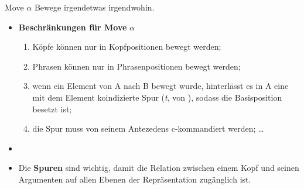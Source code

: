 \begin{frame}

\begin{block}{Move $\alpha$}
Bewege irgendetwas irgendwohin.
\end{block}

\begin{itemize}
	\item \textbf{Beschränkungen für Move} $\alpha$
	\begin{enumerate}
		\item Köpfe können nur in Kopfpositionen bewegt werden;
		\item Phrasen können nur in Phrasenpositionen bewegt werden;
		\item wenn ein Element von A nach B bewegt wurde, hinterlässt es in A eine mit dem Element koindizierte Spur (\emph{t}, von ), sodass die Basisposition besetzt ist;
		\item die Spur muss von seinem Antezedens c-kommandiert werden; \dots
	\end{enumerate}
	\item[]
	\item Die \textbf{Spuren} sind wichtig, damit die Relation zwischen einem Kopf und seinen Argumenten auf allen Ebenen der Repräsentation zugänglich ist.

\end{itemize}

\end{frame}


